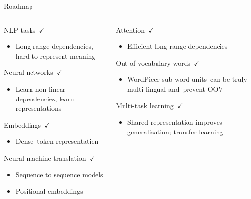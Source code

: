 \documentclass[12pt]{beamer}
\begin{document}
\begin{frame}{Roadmap}
	
	\begin{columns}
		
		\begin{column}{0.5\linewidth}
			
			
			NLP tasks $\checkmark$
			
			\begin{itemize}
				\item {\scriptsize Long-range dependencies, hard to represent meaning}
			\end{itemize}
			
			Neural networks $\checkmark$
			
			\begin{itemize}
				\item {\scriptsize Learn non-linear dependencies, learn representations}
			\end{itemize}
			
			Embeddings $\checkmark$
			
			\begin{itemize}
				\item {\scriptsize Dense token representation}
			\end{itemize}
			
			Neural machine translation $\checkmark$
			
			\begin{itemize}
				\item {\scriptsize Sequence to sequence models}
				\item {\scriptsize Positional embeddings}
			\end{itemize}
			
		\end{column}
		
		\begin{column}{0.5\linewidth}
			
			Attention $\checkmark$
			
			\begin{itemize}
				\item {\scriptsize Efficient long-range dependencies}
			\end{itemize}
			
			
			Out-of-vocabulary words $\checkmark$
			
			\begin{itemize}
				\item {\scriptsize WordPiece sub-word units can be truly multi-lingual and prevent OOV}
			\end{itemize}
			
			
			Multi-task learning $\checkmark$
			
			\begin{itemize}
				\item {\scriptsize Shared representation improves generalization; transfer learning}
			\end{itemize}
			
		
		\end{column}
		
	\end{columns}
	
\end{frame}
\end{document}
